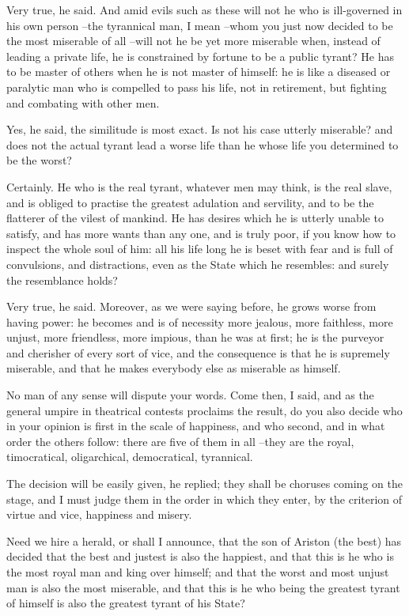 Very true, he said.
And amid evils such as these will not he who is ill-governed in his own person --the tyrannical man, I mean --whom you just now decided to be the most miserable of all --will not he be yet more miserable when, instead of leading a private life, he is constrained by fortune to be a public tyrant? He has to be master of others when he is not master of himself: he is like a diseased or paralytic man who is compelled to pass his life, not in retirement, but fighting and combating with other men.

Yes, he said, the similitude is most exact.
Is not his case utterly miserable? and does not the actual tyrant lead a worse life than he whose life you determined to be the worst?

Certainly.
He who is the real tyrant, whatever men may think, is the real slave, and is obliged to practise the greatest adulation and servility, and to be the flatterer of the vilest of mankind. He has desires which he is utterly unable to satisfy, and has more wants than any one, and is truly poor, if you know how to inspect the whole soul of him: all his life long he is beset with fear and is full of convulsions, and distractions, even as the State which he resembles: and surely the resemblance holds?

Very true, he said.
Moreover, as we were saying before, he grows worse from having power: he becomes and is of necessity more jealous, more faithless, more unjust, more friendless, more impious, than he was at first; he is the purveyor and cherisher of every sort of vice, and the consequence is that he is supremely miserable, and that he makes everybody else as miserable as himself.

No man of any sense will dispute your words.
Come then, I said, and as the general umpire in theatrical contests proclaims the result, do you also decide who in your opinion is first in the scale of happiness, and who second, and in what order the others follow: there are five of them in all --they are the royal, timocratical, oligarchical, democratical, tyrannical.

The decision will be easily given, he replied; they shall be choruses coming on the stage, and I must judge them in the order in which they enter, by the criterion of virtue and vice, happiness and misery.

Need we hire a herald, or shall I announce, that the son of Ariston (the best) has decided that the best and justest is also the happiest, and that this is he who is the most royal man and king over himself; and that the worst and most unjust man is also the most miserable, and that this is he who being the greatest tyrant of himself is also the greatest tyrant of his State?

